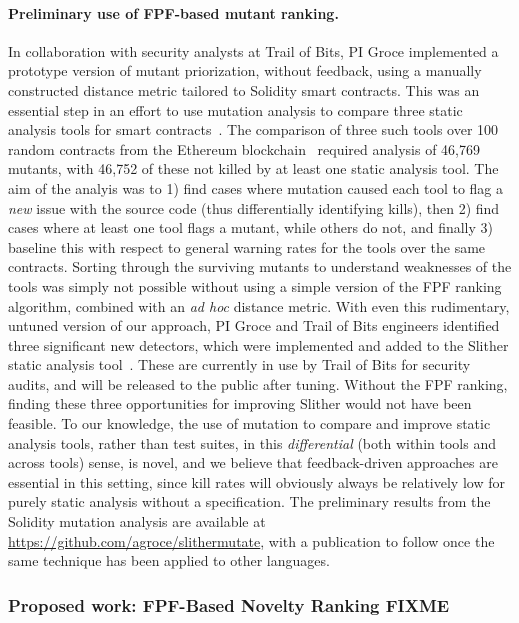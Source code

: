 \paragraph{Preliminary use of FPF-based mutant ranking.} In collaboration with security analysts at Trail of Bits, PI Groce
implemented a prototype version of mutant priorization, without
feedback, using a manually constructed distance metric tailored to
Solidity smart contracts.  This was an essential step in an effort to
use mutation analysis to compare three static analysis tools for smart
contracts~\cite{slitherpaper,sc:smartcheck,securify}.  The comparison of three such tools over 100 random contracts
from the Ethereum blockchain~\cite{buterin2013whitepaper,wood2014yellow} required analysis of 46,769 mutants, with
46,752 of these not killed by at least one static analysis tool.  The
aim of the analyis was to 1) find cases where mutation caused each
tool to flag a \emph{new} issue with the source code (thus
differentially identifying kills), then 2) find cases where at
least one tool flags a mutant, while others do not, and finally 3) baseline
this with respect to general warning rates for the tools over the same contracts.
Sorting through the surviving mutants to understand weaknesses of the
tools was simply not possible without using a simple version of the
FPF ranking algorithm, combined with an \emph{ad hoc} distance
metric.  With even this rudimentary, untuned version of our approach,
PI Groce and Trail of Bits engineers identified three significant new
detectors, which were implemented and added to the Slither static
analysis tool~\cite{slitherpaper}.  These are currently in use by Trail of Bits for
security audits, and will be released to the public after tuning.  Without the FPF ranking, finding these three
opportunities for improving Slither would not have been feasible.  To
our knowledge, the use of mutation to compare and improve static
analysis tools, rather than test suites, in this \emph{differential}
(both within tools and across tools) sense, is novel, and we believe that
feedback-driven approaches are essential in this setting, since kill
rates will obviously always be relatively low for purely static
analysis without a specification.  The preliminary results from the
Solidity mutation analysis are available at
\url{https://github.com/agroce/slithermutate}, with a publication to
follow once the same technique has been applied to other languages.

\subsubsection{Proposed work: FPF-Based Novelty Ranking FIXME} 

